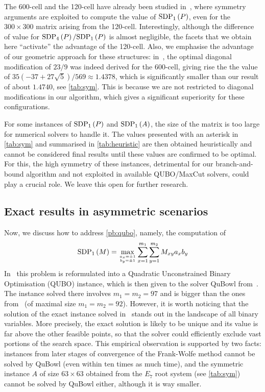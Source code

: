 \documentclass[10pt,aps,notitlepage,onecolumn,pra,superscriptaddress]{revtex4-1}
\newcommand\hb[2]{\genfrac{}{}{0pt}{}{#1}{#2}}
\newcommand\sdp[2]{\mathrm{SDP}_{#1}\ifx#2\empty\else\left({#2}\right)\fi}
\begin{document}
The 600-cell and the 120-cell have already been studied in~\cite{PV22}, where symmetry arguments are exploited to compute the value of $\sdp{1}{P}$, even for the $300\times300$ matrix arising from the 120-cell.
Interestingly, although the difference of value for $\sdp{4}{P}/\sdp{1}{P}$ is almost negligible, the facets that we obtain here ``activate'' the advantage of the 120-cell.
Also, we emphasise the advantage of our geometric approach for these structures: in~\cite{PV22}, the optimal diagonal modification of $23/9$ was indeed derived for the 600-cell, giving rise the the value of $35(-37+27\sqrt5)/569\approx1.4378$, which is significantly smaller than our result of about $1.4740$, see \cref{tab:sym}.
This is because we are not restricted to diagonal modifications in our algorithm, which gives a significant superiority for these configurations.

For some instances of $\sdp{1}{P}$ and $\sdp{1}{A}$, the size of the matrix is too large for numerical solvers to handle it.
The values presented with an asterisk in \cref{tab:sym} and summarised in \cref{tab:heuristic} are then obtained heuristically and cannot be considered final results until these values are confirmed to be optimal.
For this, the high symmetry of these instances, detrimental for our branch-and-bound algorithm and not exploited in available QUBO/MaxCut solvers, could play a crucial role.
We leave this open for further research.

\subsection{Exact results in asymmetric scenarios}
\label{sec:asy}

Now, we discuss how to address \cref{pb:qubo}, namely, the computation of
\begin{equation}
  \sdp{1}{M}=\max_{\hb{a_x=\pm1}{b_y=\pm1}}\sum_{x=1}^{m_1}\sum_{y=1}^{m_2} M_{xy}{a_x}{b_y}
  \label{eqn:qubo}
\end{equation}
In~\cite{DIB+23} this problem is reformulated into a Quadratic Unconstrained Binary Optimisation (QUBO) instance, which is then given to the solver QuBowl from~\cite{RKS23}.
The instance solved there involves $m_1=m_2=97$ and is bigger than the ones from~\cite{DBV17} (of maximal size $m_1=m_2=92$).
However, it is worth noticing that the solution of the exact instance solved in~\cite{DIB+23} stands out in the landscape of all binary variables.
More precisely, the exact solution is likely to be unique and its value is far above the other feasible points, so that the solver could efficiently exclude vast portions of the search space.
This empirical observation is supported by two facts: instances from later stages of convergence of the Frank-Wolfe method cannot be solved by QuBowl (even within ten times as much time), and the symmetric instance $A$ of size $63\times63$ obtained from the $E_7$ root system (see \cref{tab:sym}) cannot be solved by QuBowl either, although it is way smaller.
\end{document}
